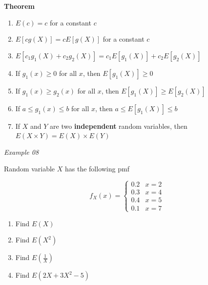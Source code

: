\documentclass[]{book}
\providecommand{\tightlist}{%
  \setlength{\itemsep}{0pt}\setlength{\parskip}{0pt}}
\begin{document}
\textbf{Theorem}

\begin{enumerate}
\def\labelenumi{\alph{enumi}.}
\tightlist
\item
  \(E(c) = c\) for a constant \(c\)
\item
  \(E[cg(X)] = cE[g(X)]\) for a constant \(c\)
\item
  \(E[c_1g_1(X)+c_2g_2(X)]= c_1E[g_1(X)]+c_2E[g_2(X)]\)
\item
  If \(g_1(x) \geq 0\) for all \(x\), then \(E[g_1(X)] \geq 0\)
\item
  If \(g_1(x) \geq g_2(x)\) for all \(x\), then \(E[g_1(X)] \geq E[g_2(X)]\)
\item
  If \(a\leq g_1(x) \leq b\) for all \(x\), then \(a\leq E[g_1(X)] \leq b\)
\item
  If \(X\) and \(Y\) are two \textbf{independent} random variables, then \(E(X \times Y) = E(X)\times E(Y)\)
\end{enumerate}

\emph{Example 08}

Random variable \(X\) has the following pmf

\begin{equation}
f_X(x) =
\begin{cases} 
0.2 &  x =2\\
0.3 &  x =4\\
0.4 &  x =5\\
0.1 &  x =7
\end{cases}
\end{equation}

\begin{enumerate}
\def\labelenumi{\arabic{enumi}.}
\tightlist
\item
  Find \(E(X)\)
\item
  Find \(E(X^2)\)
\item
  Find \(E\left( \frac{1}{X}\right)\)
\item
  Find \(E(2X+3X^2-5)\)
\end{enumerate}
\end{document}
